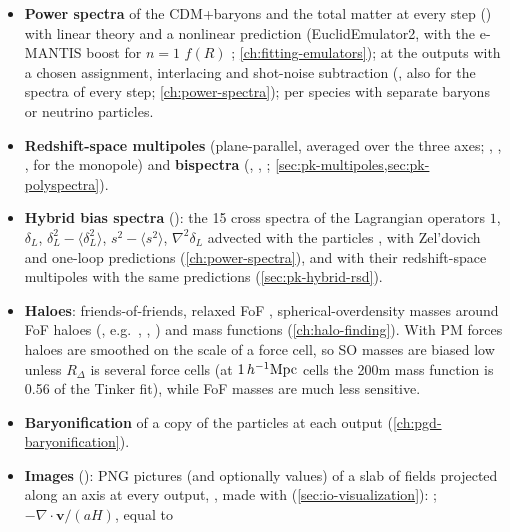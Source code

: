 \begin{itemize}
\item \textbf{Power spectra} of the CDM+baryons and the total matter at every step () with linear
      theory and a nonlinear prediction (EuclidEmulator2, with the e-MANTIS boost for $n=1$ $f(R)$ \cite{SaezCasares2023};
      \cref{ch:fitting-emulators}); at the outputs with a chosen assignment, interlacing and shot-noise subtraction
      (, also for the spectra of every step; \cref{ch:power-spectra}); per species with
      separate baryons or neutrino particles.
\item \textbf{Redshift-space multipoles} (plane-parallel, averaged over the three axes; ,
      , ,
       for the monopole) and \textbf{bispectra}
      (, , ;
      \cref{sec:pk-multipoles,sec:pk-polyspectra}).
\item \textbf{Hybrid bias spectra} (): the 15 cross spectra of the Lagrangian operators $1$,
      $\delta_L$, $\delta_L^2-\langle\delta_L^2\rangle$, $s^2-\langle s^2\rangle$, $\nabla^2\delta_L$ advected with the
      particles \cite{Modi2020,Kokron2021}, with Zel'dovich and one-loop predictions (\cref{ch:power-spectra}), and with
       their redshift-space multipoles with the same predictions (\cref{sec:pk-hybrid-rsd}).
\item \textbf{Haloes}: friends-of-friends, relaxed FoF \cite{Dai2019}, spherical-overdensity masses around FoF haloes
      (, e.g.\ , , ) and mass functions (\cref{ch:halo-finding}).
      With PM forces haloes are smoothed on the scale of a force cell, so SO masses are biased low unless $R_\Delta$ is
      several force cells (at $1\,h^{-1}\mathrm{Mpc}$ cells the 200m mass function is 0.56 of the Tinker fit), while FoF masses are much
      less sensitive.
\item \textbf{Baryonification} of a copy of the particles at each output (\cref{ch:pgd-baryonification}).
\item \textbf{Images} (): PNG pictures (and optionally  values) of a slab of fields projected
      along an axis at every output, , made with 
      (\cref{sec:io-visualization}): ;  $-\nabla\cdot\bm v/(aH)$, equal to

\end{itemize}
